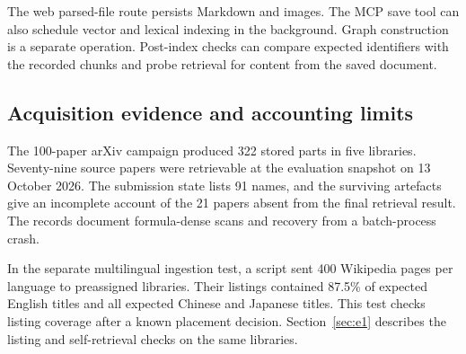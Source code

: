 The web parsed-file route persists Markdown and images. The MCP save tool
can also schedule vector and lexical indexing in the background. Graph
construction is a separate operation. Post-index checks can compare
expected identifiers with the recorded chunks and probe retrieval for
content from the saved document.

\subsection{Acquisition evidence and accounting limits}

The 100-paper arXiv campaign produced 322 stored parts in five libraries.
Seventy-nine source papers were retrievable at the evaluation snapshot on
13 October 2026. The submission state lists 91 names, and the surviving
artefacts give an incomplete account of the 21 papers absent from the final
retrieval result. The records document formula-dense scans and recovery
from a batch-process crash.

In the separate multilingual ingestion test, a script sent 400 Wikipedia
pages per language to preassigned libraries. Their listings contained
87.5\% of expected English titles and all expected Chinese and Japanese
titles. This test checks listing coverage after a known placement decision.
Section~\ref{sec:e1} describes the listing and self-retrieval checks on the
same libraries.
